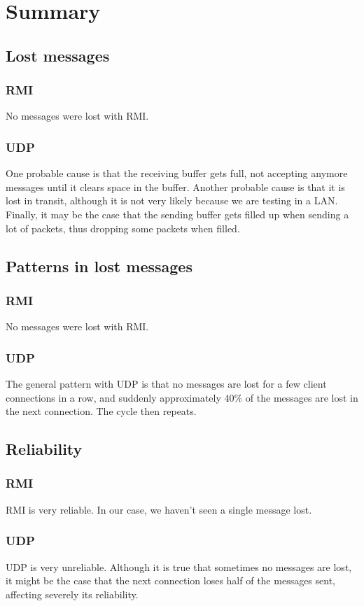 \documentclass{article}
\begin{document}
\section{Summary}
\subsection{Lost messages}
\subsubsection{RMI}
No messages were lost with RMI.
\subsubsection{UDP}
One probable cause is that the receiving buffer gets full, not accepting anymore messages until 
it clears space in the buffer. Another probable cause is that it is lost in transit, although it 
is not very likely because we are testing in a LAN. Finally, it may be the case that the sending
buffer gets filled up when sending a lot of packets, thus dropping some packets when filled.
\subsection{Patterns in lost messages}
\subsubsection{RMI}
No messages were lost with RMI.
\subsubsection{UDP}
The general pattern with UDP is that no messages are lost for a few client connections in a row,
and suddenly approximately 40\% of the messages are lost in the next connection. The cycle then repeats.
\subsection{Reliability}
\subsubsection{RMI}
RMI is very reliable. In our case, we haven't seen a single message lost.
\subsubsection{UDP}
UDP is very unreliable. Although it is true that sometimes no messages are lost, it might be the
case that the next connection loses half of the messages sent, affecting severely its reliability.
\end{document}
